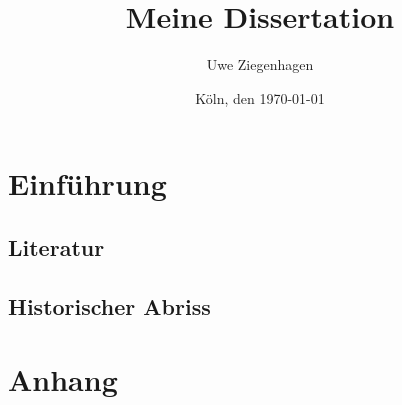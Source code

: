 \documentclass[ngerman, 12pt,oneside,parskip=half,liststotoc,bibtotoc]{scrbook}
\author{Uwe Ziegenhagen}
\title{Meine Dissertation}
\date{Köln, den \today}
\begin{document}
\maketitle

\frontmatter
\tableofcontents

\listoffigures

\listoftables

\mainmatter
\chapter{Einführung}\label{cha:einführung}
\section{Literatur}

\blindtext[1]

\blindtext[1]

\blindtext[1]

\blindtext[1]

\blindtext[2]


\section{Historischer Abriss}

\blindtext[5]

\backmatter
\chapter{Anhang}
\end{document}
